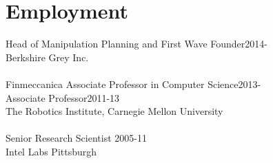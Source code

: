 
\section{Employment}
\noindent
\ifBG
Head of Manipulation Planning and First Wave Founder\hfill 2014-\\
Berkshire Grey Inc.\\
\\
\fi
Finmeccanica Associate Professor in Computer Science\hfill 2013-\\
Associate Professor\hfill 2011-13\\
The Robotics Institute, 
Carnegie Mellon University\\
\\
Senior Research Scientist \hfill 2005-11\\
Intel Labs Pittsburgh\\
